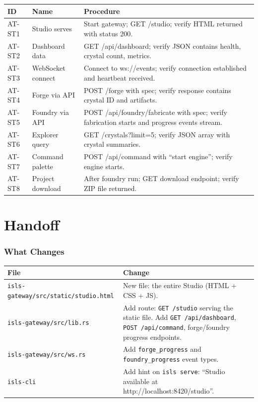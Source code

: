 \documentclass[11pt,a4paper,twoside]{article}
\begin{document}
\begin{longtable}{l l p{5.5cm}}
\toprule
\textbf{ID} & \textbf{Name} & \textbf{Procedure} \\
\midrule
\endfirsthead \midrule \endhead \bottomrule \endfoot
AT-ST1 & Studio serves & Start gateway; GET /studio; verify HTML
  returned with status 200. \\
AT-ST2 & Dashboard data & GET /api/dashboard; verify JSON contains
  health, crystal count, metrics. \\
AT-ST3 & WebSocket connect & Connect to ws://events; verify
  connection established and heartbeat received. \\
AT-ST4 & Forge via API & POST /forge with spec; verify response
  contains crystal ID and artifacts. \\
AT-ST5 & Foundry via API & POST /api/foundry/fabricate with spec;
  verify fabrication starts and progress events stream. \\
AT-ST6 & Explorer query & GET /crystals?limit=5; verify JSON array
  with crystal summaries. \\
AT-ST7 & Command palette & POST /api/command with ``start engine'';
  verify engine starts. \\
AT-ST8 & Project download & After foundry run; GET download endpoint;
  verify ZIP file returned. \\
\end{longtable}


\part{Handoff}\label{part:handoff}

\section{What Changes}

\begin{tabularx}{\textwidth}{l X}
\toprule
\textbf{File} & \textbf{Change} \\
\midrule
\texttt{isls-gateway/src/static/studio.html} & New file: the entire
  Studio (HTML + CSS + JS). \\
\texttt{isls-gateway/src/lib.rs} & Add route: \texttt{GET /studio}
  serving the static file. Add \texttt{GET /api/dashboard},
  \texttt{POST /api/command}, forge/foundry progress endpoints. \\
\texttt{isls-gateway/src/ws.rs} & Add \texttt{forge\_progress} and
  \texttt{foundry\_progress} event types. \\
\texttt{isls-cli} & Add hint on \texttt{isls serve}: ``Studio
  available at http://localhost:8420/studio''. \\
\bottomrule
\end{tabularx}
\end{document}
